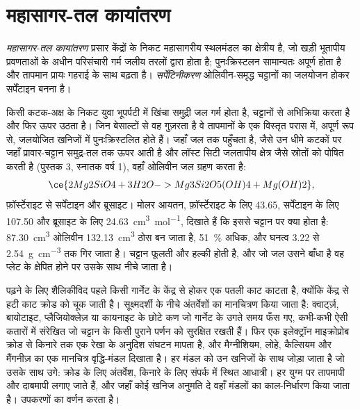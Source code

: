\section{महासागर-तल कायांतरण}\label{sec:b2:pt-paths:ocean-floor}

\begin{definition}\label{def:b2:pt-paths:ocean-floor}
\emph{महासागर-तल कायांतरण} प्रसार केंद्रों के निकट
महासागरीय स्थलमंडल का क्षेत्रीय  है, जो खड़ी भूतापीय प्रवणताओं के अधीन
परिसंचारी गर्म जलीय तरलों द्वारा होता है; पुनःक्रिस्टलन सामान्यतः अपूर्ण होता है
और तापमान प्रायः गहराई के साथ बढ़ता है। \emph{सर्पेंटिनीकरण}
ओलिवीन-समृद्ध चट्टानों का जलयोजन होकर सर्पेंटाइन बनना है।
\end{definition}

किसी कटक-अक्ष के निकट युवा भूपर्पटी में खिंचा समुद्री जल गर्म होता है, चट्टानों से अभिक्रिया करता है और
फिर ऊपर उठता है। जिन बेसाल्टों से वह गुज़रता है वे तापमानों के एक विस्तृत परास में, अपूर्ण रूप से,
जलयोजित खनिजों में पुनःक्रिस्टलित होते हैं। जहाँ जल  तक पहुँचता है, जैसे
उन धीमे कटकों पर जहाँ प्रावार-चट्टान समुद्र-तल तक ऊपर आती है और लॉस्ट सिटी जलतापीय क्षेत्र जैसे
स्रोतों को पोषित करती है (पुस्तक 3, स्नातक वर्ष 1), वहाँ ओलिवीन जल ग्रहण करता है:
\[
\ce{2 Mg2SiO4 + 3 H2O -> Mg3Si2O5(OH)4 + Mg(OH)2},
\]
फ़ॉर्स्टेराइट से सर्पेंटाइन और ब्रूसाइट। मोलर आयतन, फ़ॉर्स्टेराइट के लिए 43.65, सर्पेंटाइन के लिए 107.50
और ब्रूसाइट के लिए \qty{24.63}{cm^3.mol^{-1}}, दिखाते हैं कि इससे चट्टान पर क्या होता है:
\qty{87.30}{cm^3} ओलिवीन \qty{132.13}{cm^3} ठोस बन जाता है, \qty{51}{\percent}
अधिक, और घनत्व 3.22 से \qty{2.54}{g.cm^{-3}} तक गिर जाता है। चट्टान फूलती और
हल्की होती है, और जो जल उसने बाँधा है वह प्लेट के क्षेपित होने पर उसके साथ नीचे जाता है।

\begin{inthelab}[एक गार्नेट को पढ़ना]
 पढ़ने के लिए शैलिकीविद पहले किसी गार्नेट के केंद्र से होकर एक पतली काट काटता है,
क्योंकि केंद्र से हटी काट क्रोड को चूक जाती है। सूक्ष्मदर्शी के नीचे अंतर्वेशों
का मानचित्रण किया जाता है: क्वार्ट्ज़, बायोटाइट, प्लैजियोक्लेज़ या कायनाइट के छोटे कण जो गार्नेट के
उगते समय फँस गए, कभी-कभी ऐसी कतारों में संरेखित जो चट्टान के किसी पुराने पर्णन को सुरक्षित रखती हैं। फिर एक इलेक्ट्रॉन
माइक्रोप्रोब क्रोड से किनारे तक एक रेखा के अनुदिश संघटन मापता है, और
मैग्नीशियम, लोहे, कैल्सियम और मैंगनीज़ का एक मानचित्र वृद्धि-मंडल दिखाता है। हर मंडल को
उन खनिजों के साथ जोड़ा जाता है जो उसके साथ उगे: क्रोड के लिए अंतर्वेश, किनारे के लिए संपर्क में
स्थित आधात्री। हर युग्म पर तापमापी और दाबमापी लगाए जाते हैं, और जहाँ कोई
खनिज अनुमति दे वहाँ मंडलों का काल-निर्धारण किया जाता है।  उपकरणों का वर्णन करता है।
\end{inthelab}

